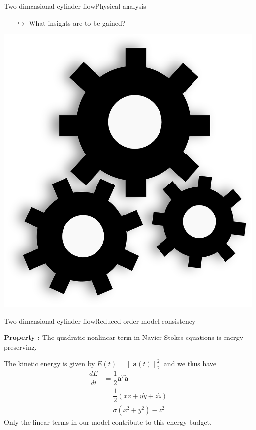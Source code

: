 \documentclass[usenames,dvipsnames,svgnames,10pt,aspectratio=169]{beamer}
\begin{document}
\begin{frame}[t, c]{Two-dimensional cylinder flow}{Physical analysis}
\begin{minipage}{.68\textwidth}
\begin{itemize}
\begin{itemize}
      \item[$\hookrightarrow$] What insights are to be gained?
      \end{itemize}
    \end{itemize}
  \end{minipage}%
  \hfill
  \begin{minipage}{.28\textwidth}
    \centering
    \includegraphics[width=\textwidth]{Gears}
  \end{minipage}
\end{frame}




\begin{frame}[t, c]{Two-dimensional cylinder flow}{Reduced-order model consistency}
  \begin{tcolorbox}[colback=white, colframe=beamer@kthblue]
    \textbf{Property :} The quadratic nonlinear term in Navier-Stokes equations is energy-preserving.
  \end{tcolorbox}
  
  \bigskip
  
  The kinetic energy is given by $E(t) = \| \bm{a}(t) \|_2^2$ and we thus have
  \[
  \begin{aligned}
    \dfrac{dE}{dt} & = \dfrac{1}{2} \bm{a}^T \dot{\bm{a}} \\
    & = \dfrac{1}{2} \left( x  \dot{x} + y \dot{y} + z \dot{z} \right) \\
    & = \sigma (x^2 + y^2) - z^2
  \end{aligned}
  \]
  Only the linear terms in our model contribute to this energy budget.
\end{frame}
\end{document}
